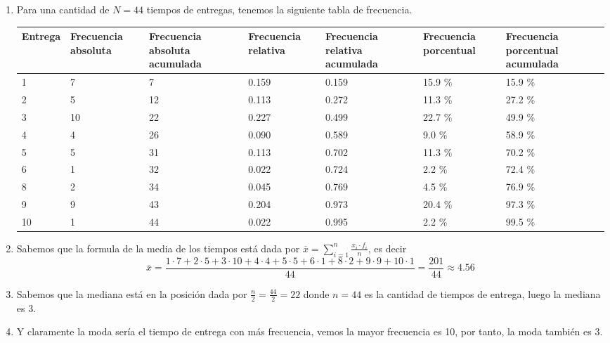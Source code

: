 \begin{solution}
    \begin{enumerate}
        \item Para una cantidad de $N = 44$ tiempos de entregas, tenemos la siguiente tabla de frecuencia.
        \begin{table}[H]
            \centering
            \begin{tabular}{|p{1.7cm}|p{1.8cm}|p{2cm}|p{1.8cm}|p{2cm}|p{2cm}|p{2cm}|}
                \hline
                Entrega & Frecuencia absoluta & Frecuencia absoluta acumulada & Frecuencia relativa & Frecuencia relativa acumulada & Frecuencia porcentual & Frecuencia porcentual acumulada\\
                \hline\hline
                 1 &  7 &  7 & 0.159 & 0.159 & 15.9 \% & 15.9 \% \\\hline
                 2 &  5 & 12 & 0.113 & 0.272 & 11.3 \% & 27.2 \% \\\hline
                 3 & 10 & 22 & 0.227 & 0.499 & 22.7 \% & 49.9 \% \\\hline
                 4 &  4 & 26 & 0.090 & 0.589 &  9.0 \% & 58.9 \% \\\hline
                 5 &  5 & 31 & 0.113 & 0.702 & 11.3 \% & 70.2 \% \\\hline
                 6 &  1 & 32 & 0.022 & 0.724 &  2.2 \% & 72.4 \% \\\hline
                 8 &  2 & 34 & 0.045 & 0.769 &  4.5 \% & 76.9 \% \\\hline
                 9 &  9 & 43 & 0.204 & 0.973 & 20.4 \% & 97.3 \% \\\hline
                10 &  1 & 44 & 0.022 & 0.995 &  2.2 \% & 99.5 \% \\\hline
            \end{tabular}
        \end{table}
        \item Sabemos que la formula de la media de los tiempos está dada por $\overline{x} = \sum_{i = 1}^{n} \frac{x_i \cdot f_i}{n}$, es decir
        \[
            \overline{x} = \frac{1\cdot 7 + 2\cdot 5 + 3\cdot 10 + 4\cdot 4 + 5 \cdot 5 + 6 \cdot 1 + 8 \cdot 2 + 9 \cdot 9 + 10 \cdot 1}{44} = \frac{201}{44} \approx 4.56
        \]
        \item Sabemos que la mediana está en la posición dada por $\frac{n}{2} = \frac{44}{2} = 22$ donde $n = 44$ es la cantidad de tiempos de entrega, luego la mediana es 3.
        \item Y claramente la moda sería el tiempo de entrega con más frecuencia, vemos la mayor frecuencia es 10, por tanto, la moda también es 3. \qedhere
    \end{enumerate}
\end{solution}

